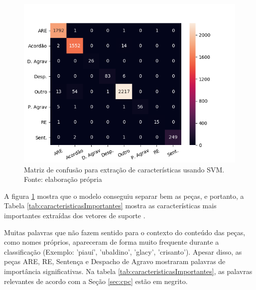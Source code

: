 \begin{figure}[h]
	\includegraphics[keepaspectratio=true,scale=0.5]{figuras/confusionMatrixSMV}
    \centering
	\caption[Matriz de confusão para extração de características usando SVM]{Matriz de confusão para extração de características usando SVM. Fonte: elaboração própria}
	\label{fig:svmDisperssao}
\end{figure}

A figura \ref{fig:svmDisperssao} mostra que o modelo conseguiu separar bem as peças, e portanto, a Tabela \ref{tab:caracteristicasImportantes} mostra as características mais importantes extraídas dos vetores de suporte \cite{HEARST1995}.

Muitas palavras que não fazem sentido para o contexto do conteúdo das peças, como nomes próprios, apareceram de forma muito frequente durante a classificação (Exemplo: 'piauí', 'ubaldino', 'glacy', 'crisanto'). Apesar disso, as peças ARE, RE, Sentença e Despacho de Agravo mostraram palavras de importância significativas. Na tabela \ref{tab:caracteristicasImportantes}, as palavras relevantes de acordo com a Seção \ref{sec:cpc} estão em negrito.


